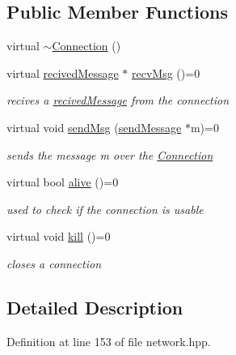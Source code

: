 \subsection*{Public Member Functions}
\begin{DoxyCompactItemize}
\item 
virtual \hyperlink{classllu_1_1network_1_1_connection_ad549cc793bf214a9097a62fa7fc01b33}{$\sim$\+Connection} ()
\item 
virtual \hyperlink{structllu_1_1network_1_1recived_message}{recived\+Message} $\ast$ \hyperlink{classllu_1_1network_1_1_connection_aae606f5aad246e892db5665cd7be1747}{recv\+Msg} ()=0
\begin{DoxyCompactList}\small\item\em recives a \hyperlink{structllu_1_1network_1_1recived_message}{recived\+Message} from the connection \end{DoxyCompactList}\item 
virtual void \hyperlink{classllu_1_1network_1_1_connection_ac20ca6d4d56b39fadde27b6af10000ae}{send\+Msg} (\hyperlink{structllu_1_1network_1_1send_message}{send\+Message} $\ast$m)=0
\begin{DoxyCompactList}\small\item\em sends the message m over the \hyperlink{classllu_1_1network_1_1_connection}{Connection} \end{DoxyCompactList}\item 
virtual bool \hyperlink{classllu_1_1network_1_1_connection_a05893a11a26ea97663637cf085e1b985}{alive} ()=0
\begin{DoxyCompactList}\small\item\em used to check if the connection is usable \end{DoxyCompactList}\item 
virtual void \hyperlink{classllu_1_1network_1_1_connection_a7e620755dde598fffc96d3ee6b3326a1}{kill} ()=0
\begin{DoxyCompactList}\small\item\em closes a connection \end{DoxyCompactList}\end{DoxyCompactItemize}


\subsection{Detailed Description}


Definition at line 153 of file network.\+hpp.



